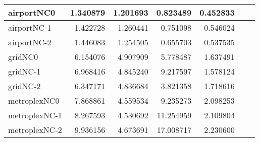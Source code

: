 \begin{longtable}{|l|r|r|r|r|r|r|}
airportNC0 & 1.340879 & 1.201693 & 0.823489 & 0.452833 \\ \hline
airportNC-1 & 1.422728 & 1.260441 & 0.751098 & 0.546024 \\ \hline
airportNC-2 & 1.446083 & 1.254505 & 0.655703 & 0.537535 \\ \hline
gridNC0 & 6.154076 & 4.907909 & 5.778487 & 1.637491 \\ \hline
gridNC-1 & 6.968416 & 4.845240 & 9.217597 & 1.578124 \\ \hline
gridNC-2 & 6.347171 & 4.836684 & 3.821358 & 1.718616 \\ \hline
metroplexNC0 & 7.868861 & 4.559534 & 9.235273 & 2.098253 \\ \hline
metroplexNC-1 & 8.267593 & 4.530692 & 11.254959 & 2.109804 \\ \hline
metroplexNC-2 & 9.936156 & 4.673691 & 17.008717 & 2.230600 \\ \hline
\end{longtable}
